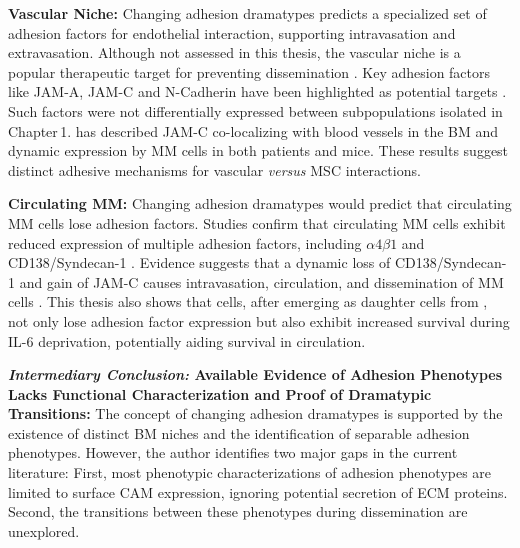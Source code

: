 \textbf{Vascular Niche:}
Changing adhesion dramatypes predicts a specialized set of adhesion factors for
endothelial interaction, supporting intravasation and extravasation. Although
not assessed in this thesis, the vascular niche is a popular therapeutic target
for preventing dissemination \cite{neriTargetingAdhesionMolecules2012}. Key
adhesion factors like JAM-A, JAM-C and N-Cadherin have been highlighted as
potential targets \cite{solimandoHaltingViciousCycle2020,
      mrozikTherapeuticTargetingNcadherin2015, brandlJunctionalAdhesionMolecule2022}.
Such factors were not differentially expressed between subpopulations isolated
in Chapter\,1. \citet{brandlJunctionalAdhesionMolecule2022} has described JAM-C
co-localizing with blood vessels in the \ac{BM} and dynamic expression by MM
cells in both patients and mice. These results suggest distinct adhesive
mechanisms for vascular \textit{versus} \ac{MSC} interactions.


\textbf{Circulating MM:}
Changing adhesion dramatypes would predict that circulating MM cells lose adhesion
factors. Studies confirm that  circulating
\ac{MM} cells exhibit reduced expression%
%
of multiple adhesion factors, including $\alpha4\beta1$ and CD138/Syndecan-1
\cite{paivaDetailedCharacterizationMultiple2013,
      paivaCompetitionClonalPlasma2011, akhmetzyanovaDynamicCD138Surface2020}.
Evidence suggests that a dynamic loss of CD138/Syndecan-1 and gain of JAM-C
causes intravasation, circulation, and dissemination of MM cells
\cite{akhmetzyanovaDynamicCD138Surface2020,
      brandlJunctionalAdhesionMolecule2022}. This thesis also shows that \nMAina
cells, after emerging as daughter cells from \MAina, not only lose adhesion
factor expression but also exhibit increased survival during IL-6 deprivation,
potentially aiding survival in circulation.


\textbf{\textit{Intermediary Conclusion:} Available Evidence of Adhesion
      Phenotypes Lacks Functional Characterization and Proof of Dramatypic
      Transitions:} The concept of changing adhesion dramatypes is supported by the
existence of distinct BM niches and the identification of separable adhesion
phenotypes. However, the author identifies two major gaps in the current
literature: First, most phenotypic characterizations of adhesion phenotypes are
limited to surface \ac{CAM} expression, ignoring potential secretion of \ac{ECM}
proteins. Second, the transitions between these phenotypes during dissemination
are unexplored.

